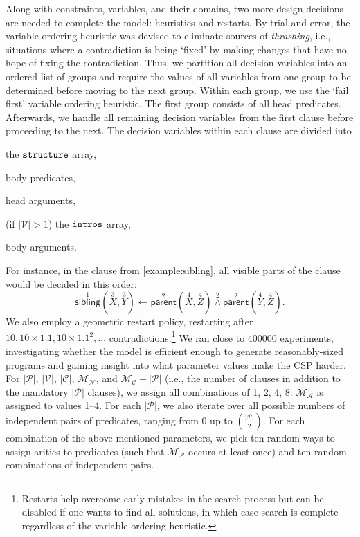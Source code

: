 \documentclass[runningheads]{llncs}
\newcommand{\variable}[1]{\texttt{\textup{#1}}}
\newcommand{\predicates}{\mathcal{P}}
\newcommand{\variables}{\mathcal{V}}
\newcommand{\constants}{\mathcal{C}}
\newcommand{\maxArity}{\mathcal{M}_{\mathcal{A}}}
\newcommand{\maxNumNodes}{\mathcal{M}_{\mathcal{N}}}
\newcommand{\maxNumClauses}{\mathcal{M}_{\mathcal{C}}}
\begin{document}
Along with constraints, variables, and their domains, two more design decisions
are needed to complete the model: heuristics and restarts. By trial and error,
the variable ordering heuristic was devised to eliminate sources of
\emph{thrashing}, i.e., situations where a contradiction is being `fixed' by
making changes that have no hope of fixing the contradiction. Thus, we partition
all decision variables into an ordered list of groups and require the values of
all variables from one group to be determined before moving to the next group.
Within each group, we use the `fail first' variable ordering heuristic. The
first group consists of all head predicates. Afterwards, we handle all remaining
decision variables from the first clause before proceeding to the next. The
decision variables within each clause are divided into
\begin{enumerate*}[(a)]
\item the $\variable{structure}$ array,
\item body predicates,
\item head arguments,
\item (if $|\variables{}| > 1$) the $\variable{intros}$ array,
\item body arguments.
\end{enumerate*}
For instance, in the clause from \cref{example:sibling}, all visible parts of
the clause would be decided in this order:
\[
  \overset{1}{\mathsf{sibling}}(\overset{3}{X}, \overset{3}{Y}) \gets
  \overset{2}{\mathsf{parent}}(\overset{4}{X}, \overset{4}{Z})
  \overset{2}{\land} \overset{2}{\mathsf{parent}}(\overset{4}{Y},
  \overset{4}{Z}).
\]
We also employ a geometric restart policy, restarting after $10, 10 \times 1.1,
10 \times 1.1^2, \dots$ contradictions.\footnote{Restarts help overcome early
  mistakes in the search process but can be disabled if one wants to find all
  solutions, in which case search is complete regardless of the variable
  ordering heuristic.} We ran close to \num{400000} experiments, investigating
whether the model is efficient enough to generate reasonably-sized programs and
gaining insight into what parameter values make the CSP harder. For
$|\predicates{}|$, $|\variables{}|$, $|\constants{}|$, $\maxNumNodes{}$, and
$\maxNumClauses{} - |\predicates{}|$ (i.e., the number of clauses in addition to
the mandatory $|\predicates{}|$ clauses), we assign all combinations of 1, 2, 4,
8. $\maxArity{}$ is assigned to values 1--4. For each $|\predicates{}|$, we also
iterate over all possible numbers of independent pairs of predicates, ranging
from 0 up to $\binom{|\predicates{}|}{2}$. For each combination of the
above-mentioned parameters, we pick ten random ways to assign arities to
predicates (such that $\maxArity{}$ occurs at least once) and ten random
combinations of independent pairs.
\end{document}
